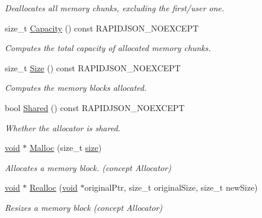 \begin{DoxyCompactItemize}
\begin{DoxyCompactList}\small\item\em Deallocates all memory chunks, excluding the first/user one. \end{DoxyCompactList}\item 
size\+\_\+t \hyperlink{classMemoryPoolAllocator_a60526f0a1e6bb225c49f10537635e30f}{Capacity} () const R\+A\+P\+I\+D\+J\+S\+O\+N\+\_\+\+N\+O\+E\+X\+C\+E\+PT
\begin{DoxyCompactList}\small\item\em Computes the total capacity of allocated memory chunks. \end{DoxyCompactList}\item 
size\+\_\+t \hyperlink{classMemoryPoolAllocator_a53abb6188aea4a687ca9f6d778fd1d2d}{Size} () const R\+A\+P\+I\+D\+J\+S\+O\+N\+\_\+\+N\+O\+E\+X\+C\+E\+PT
\begin{DoxyCompactList}\small\item\em Computes the memory blocks allocated. \end{DoxyCompactList}\item 
bool \hyperlink{classMemoryPoolAllocator_aee5e0b6d09dfbbc9bbbc59399a14cc53}{Shared} () const R\+A\+P\+I\+D\+J\+S\+O\+N\+\_\+\+N\+O\+E\+X\+C\+E\+PT
\begin{DoxyCompactList}\small\item\em Whether the allocator is shared. \end{DoxyCompactList}\item 
\hyperlink{imgui__impl__opengl3__loader_8h_ac668e7cffd9e2e9cfee428b9b2f34fa7}{void} $\ast$ \hyperlink{classMemoryPoolAllocator_a02f6832910453446cb77bf919ba49e99}{Malloc} (size\+\_\+t \hyperlink{imgui__impl__opengl3__loader_8h_a3d1e3edfcf61ca2d831883e1afbad89e}{size})
\begin{DoxyCompactList}\small\item\em Allocates a memory block. (concept Allocator) \end{DoxyCompactList}\item 
\hyperlink{imgui__impl__opengl3__loader_8h_ac668e7cffd9e2e9cfee428b9b2f34fa7}{void} $\ast$ \hyperlink{classMemoryPoolAllocator_aba75280d42184b0ad414243f7f5ac6c7}{Realloc} (\hyperlink{imgui__impl__opengl3__loader_8h_ac668e7cffd9e2e9cfee428b9b2f34fa7}{void} $\ast$original\+Ptr, size\+\_\+t original\+Size, size\+\_\+t new\+Size)
\begin{DoxyCompactList}\small\item\em Resizes a memory block (concept Allocator) \end{DoxyCompactList}\item 

\end{DoxyCompactItemize}
